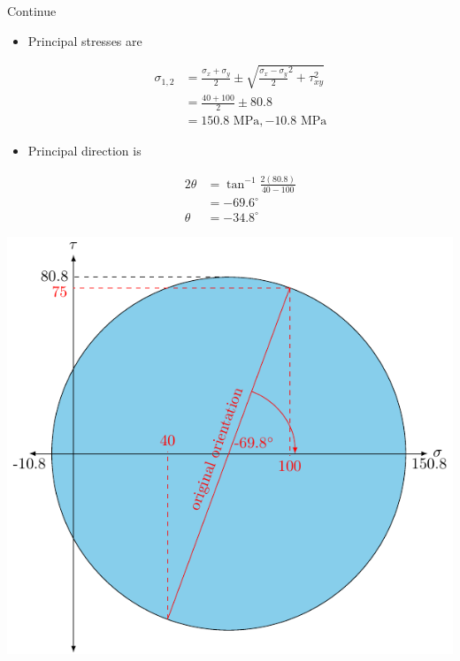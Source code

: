 \documentclass[10pt, svgnames]{beamer}
\begin{document}
\begin{frame}[label={sec:orgc502be2}]{Continue}
\begin{itemize}
\item Principal stresses are

\begin{align*}
  \sigma_{1,2} &= \frac{\sigma_x + \sigma _y}{2} \pm \sqrt {\frac{\sigma _x - \sigma_y}{2}^2 + \tau _{xy}^2}  \\
               &= \frac{40 + 100}{2} \pm 80.8 \\
               &= 150.8 \text{ MPa}, - 10.8 \text{ MPa}
\end{align*}

\item Principal direction is

\begin{align*}
  2\theta  &= \tan^{-1}\frac{2(80.8)}{40 - 100} \\
           &= -69.6^{\circ} \\
  \theta &= -34.8^{\circ}
\end{align*}
\end{itemize}
\end{frame}

\begin{frame}[label={sec:org30d12d1}]{}
\begin{center}
\includegraphics[width=.9\linewidth]{pictures/example-II-mohrs.pdf}
\end{center}
\end{frame}
\end{document}
